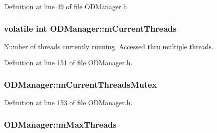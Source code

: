 Definition at line 49 of file O\+D\+Manager.\+h.

\subsubsection[{\texorpdfstring{m\+Current\+Threads}{mCurrentThreads}}]{\setlength{\rightskip}{0pt plus 5cm}volatile {\bf int} O\+D\+Manager\+::m\+Current\+Threads\hspace{0.3cm}{\ttfamily [protected]}}\hypertarget{class_o_d_manager_a06856d83f378f240132c1520405f5040}{}\label{class_o_d_manager_a06856d83f378f240132c1520405f5040}


Number of threads currently running. Accessed thru multiple threads. 



Definition at line 151 of file O\+D\+Manager.\+h.

\subsubsection[{\texorpdfstring{m\+Current\+Threads\+Mutex}{mCurrentThreadsMutex}}]{ O\+D\+Manager\+::m\+Current\+Threads\+Mutex\hspace{0.3cm}{\ttfamily [protected]}}\hypertarget{class_o_d_manager_abed3761c5ea4877de3d9ec263b3da865}{}\label{class_o_d_manager_abed3761c5ea4877de3d9ec263b3da865}


Definition at line 153 of file O\+D\+Manager.\+h.

\subsubsection[{\texorpdfstring{m\+Max\+Threads}{mMaxThreads}}]{ O\+D\+Manager\+::m\+Max\+Threads\hspace{0.3cm}{\ttfamily [protected]}}\hypertarget{class_o_d_manager_ac85438f32145747ba36ebf7087860a35}{}\label{class_o_d_manager_ac85438f32145747ba36ebf7087860a35}


